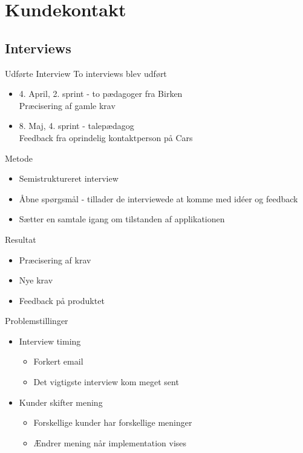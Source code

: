 \section{Kundekontakt}

\subsection{Interviews}

\begin{frame}{Udførte Interview}
To interviews blev udført 

\begin{itemize}
\item 4. April, 2. sprint - to pædagoger fra Birken \\ Præcisering af gamle krav
\item 8. Maj, 4. sprint - talepædagog \\Feedback fra oprindelig kontaktperson på Cars 
\end{itemize}

\end{frame}

\begin{frame}{Metode}
\begin{itemize}
\item Semistruktureret interview 
\item Åbne spørgsmål - tillader de interviewede at komme med idéer og feedback
\item Sætter en samtale igang om tilstanden af applikationen
\end{itemize}
\end{frame}

\begin{frame}{Resultat}
\begin{itemize}
\item Præcisering af krav
\item Nye krav
\item Feedback på produktet
\end{itemize}
\end{frame}

\begin{frame}{Problemstillinger}
\begin{itemize}
\item Interview timing
\begin{itemize}
\item Forkert email
\item Det vigtigste interview kom meget sent
\end{itemize}
\item Kunder skifter mening
\begin{itemize}
\item Forskellige kunder har forskellige meninger
\item Ændrer mening når implementation vises
\end{itemize}
\end{itemize}
\end{frame}

